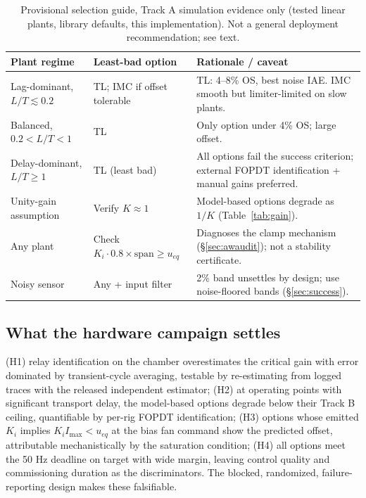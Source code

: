 \documentclass[10pt,twocolumn]{article}
\begin{document}
\begin{table}[t]
\centering
\caption{Provisional selection guide, Track A simulation evidence only (tested linear plants, library defaults, this implementation). Not a general deployment recommendation; see text.}
\label{tab:selmatrix}
\small
\setlength{\tabcolsep}{4pt}
\begin{tabular}{@{}p{2.6cm}p{2.1cm}p{2.6cm}@{}}
\toprule
Plant regime & Least-bad option & Rationale / caveat \\
\midrule
Lag-dominant, $L/T \lesssim 0.2$ & TL; IMC if offset tolerable & TL: 4--8\% OS, best noise IAE. IMC smooth but limiter-limited on slow plants. \\
Balanced, $0.2 < L/T < 1$ & TL & Only option under 4\% OS; large offset. \\
Delay-dominant, $L/T \ge 1$ & TL (least bad) & All options fail the success criterion; external FOPDT identification + manual gains preferred. \\
Unity-gain assumption & Verify $K \approx 1$ & Model-based options degrade as $1/K$ (Table~\ref{tab:gain}). \\
Any plant & Check $K_i \cdot 0.8 \times \text{span} \ge u_{eq}$ & Diagnoses the clamp mechanism (\S\ref{sec:awaudit}); not a stability certificate. \\
Noisy sensor & Any + input filter & 2\% band unsettles by design; use noise-floored bands (\S\ref{sec:success}). \\
\bottomrule
\end{tabular}
\end{table}

\subsection{What the hardware campaign settles}

(H1) relay identification on the chamber overestimates the critical gain with error dominated by transient-cycle averaging, testable by re-estimating from logged traces with the released independent estimator; (H2) at operating points with significant transport delay, the model-based options degrade below their Track B ceiling, quantifiable by per-rig FOPDT identification; (H3) options whose emitted $K_i$ implies $K_i I_{\max} < u_{eq}$ at the bias fan command show the predicted offset, attributable mechanistically by the saturation condition; (H4) all options meet the 50 Hz deadline on target with wide margin, leaving control quality and commissioning duration as the discriminators. The blocked, randomized, failure-reporting design makes these falsifiable.
\end{document}
